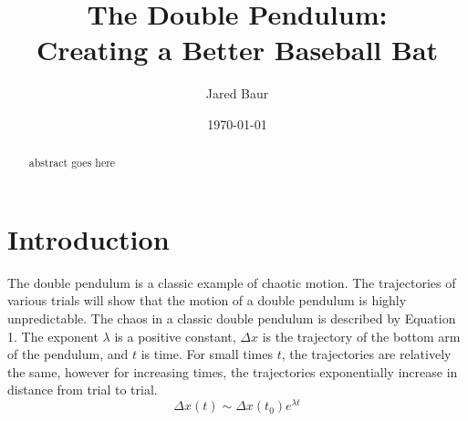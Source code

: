 \documentclass[%
 aip,
 amsmath,amssymb,
 reprint,%
 floatfix,%
]{revtex4-1}
\begin{document}

\title[]{The Double Pendulum:\\Creating a Better Baseball Bat}

\author{Jared Baur}

\date{\today}%

\begin{abstract}
	abstract goes here
\end{abstract}

\maketitle


\section{\label{sec:level1}Introduction}

The double pendulum is a classic example of chaotic motion\cite{Shinbrot1992}. The trajectories of various trials will show that the motion of a double pendulum is highly unpredictable. The chaos in a classic double pendulum is described by Equation 1. The exponent $\lambda$ is a positive constant, $\Delta x$ is the trajectory of the bottom arm of the pendulum, and $t$ is time. For small times $t$, the trajectories are relatively the same, however for increasing times, the trajectories exponentially increase in distance from trial to trial.
\begin{equation}
	\Delta x(t) \sim \Delta x(t_0) e^{\lambda t}
\end{equation}
\end{document}
